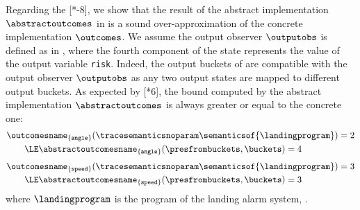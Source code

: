 \begin{example}
  Regarding the [*-8], we show that the result of the abstract implementation $\abstractoutcomes$ in  is a sound over-approximation of the concrete implementation $\outcomes$.
  \marginnote{
    \[
  \outputobs(\defstate) \DefeQ \left\{\begin{array}{l}
    \langle \top, \top, \top, d \rangle \\
    \qquad \text{if } \defstate = \langle a, b, c, d \rangle \\
    \langle \top, \top, \top, \top \rangle \\
    \qquad \text{otherwise}
  \end{array}\right.
  \]
  }
  We assume the output observer $\outputobs$ is defined as in , where the fourth component of the state represents the value of the output variable \texttt{risk}.
  Indeed, the output buckets of  are compatible with the output observer $\outputobs$ as any two output states are mapped to different output buckets.
  As expected by [*6], the bound computed by the abstract implementation $\abstractoutcomes$ is always greater or equal to the concrete one:
  \begin{align*}
    & \outcomesname_{\{\texttt{angle}\}}(\tracesemanticsnoparam\semanticsof{\landingprogram}) = 2 \\
    &\qquad\LE \abstractoutcomesname_{\{\texttt{angle}\}}(\presfrombuckets, \buckets) = 4
  \end{align*}
  \begin{align*}
    & \outcomesname_{\{\texttt{speed}\}}(\tracesemanticsnoparam\semanticsof{\landingprogram}) = 3 \\
    &\qquad\LE \abstractoutcomesname_{\{\texttt{speed}\}}(\presfrombuckets, \buckets) = 3 \\
  \end{align*}
  where $\landingprogram$ is the program of the landing alarm system, \cf{} .
\end{example}

